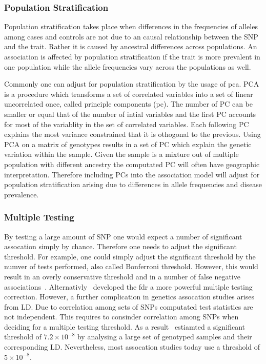 \subsubsection{Population Stratification}
\label{ssub:population_stratification}
Population stratification takes place when differences in the frequencies of alleles among cases and controls are not due to an causal relationship between the SNP and the trait.
Rather it is caused by ancestral differences across populations.
An association is affected by population stratification if the trait is more prevalent in one population while the allele frequencies vary across the populations as well.

Commonly one can adjust for population stratification by the usage of \acrfull{pca}.
PCA is a procedure which transforms a set of correlated variables into a set of linear uncorrelated once, called principle components (\acrshort{pc}).
The number of PC can be smaller or equal that of the number of intial variables and the first PC accounts for most of the variablity in the set of correlated variables.
Each following PC explains the most variance constrained that it is othogonal to the previous.
Using PCA on a matrix of genotypes results in a set of PC which explain the genetic variation within the sample.
Given the sample is a mixture out of multiple population with different ancestry the computated PC will often have geographic interpretation.
Therefore including PCs into the association model will adjust for population stratification arising due to differences in allele frequencies and disease prevalence.

\subsubsection{Multiple Testing}
\label{ssub:multiple_testing}
By testing a large amount of SNP one would expect a number of significant assocation simply by chance.
Therefore one needs to adjust the significant threshold.
For example, one could simply adjust the significant threshold by the numver of tests performed, also called Bonferroni threshold.
However, this would result in an overly conservative threshold and in a number of false negative associations~\cite{Benjamini1995}.
Alternativly~\citet{Benjamini1995} developed the \acrfull{fdr} a more powerful multiple testing correction. 
However, a further complication in genetics assocation studies arises from LD\@.
Due to correlation among sets of SNPs computated test statistics are not independent.
This requires to consinder correlation among SNPs when deciding for a multiple testing threshold.
As a result~\citet{Dudbridge2008} estiamted a significant threshold of $7.2 \times 10^{-8}$ by analysing a large set of genotyped samples and their corresponding LD\@.
Nevertheless, most assocation studies today use a threshold of $5\times 10^{-8}$. %


